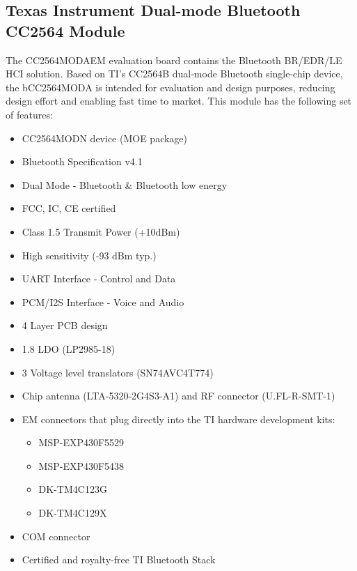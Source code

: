 \subsection{Texas Instrument Dual-mode Bluetooth CC2564 Module}
The CC2564MODAEM evaluation board contains the Bluetooth BR/EDR/LE HCI solution. Based on TI's CC2564B dual-mode Bluetooth single-chip device, the bCC2564MODA is intended for evaluation and design purposes, reducing design effort and enabling fast time to market. This module has the following set of features:
\begin{itemize}
	\item CC2564MODN device (MOE package)
	\item Bluetooth Specification v4.1
	\item Dual Mode - Bluetooth \& Bluetooth low energy
	\item FCC, IC, CE certified
	\item Class 1.5 Transmit Power (+10dBm)
	\item High sensitivity (-93 dBm typ.)
	\item UART Interface - Control and Data
	\item PCM/I2S Interface - Voice and Audio
	\item 4 Layer PCB design
	\item 1.8 LDO (LP2985-18)
	\item 3 Voltage level translators (SN74AVC4T774)
	\item Chip antenna (LTA-5320-2G4S3-A1) and RF connector (U.FL-R-SMT-1)
	\item EM connectors that plug directly into the TI hardware development kits:
	\begin{itemize}
		\item MSP-EXP430F5529
		\item MSP-EXP430F5438
		\item DK-TM4C123G
		\item DK-TM4C129X
	\end{itemize}
	\item COM connector
	\item Certified and royalty-free TI Bluetooth Stack
\end{itemize}
